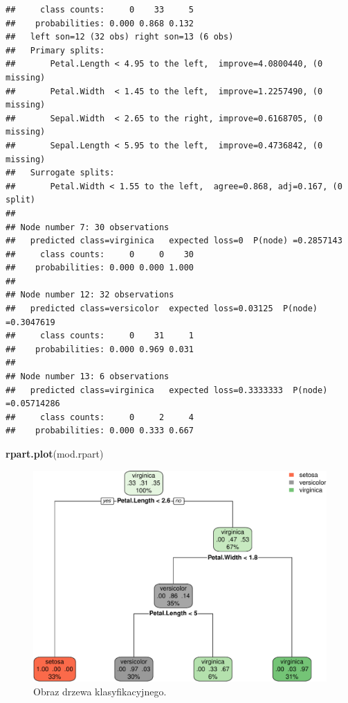 \documentclass[]{book}
\newenvironment{Shaded}{\begin{snugshade}}{\end{snugshade}}
\newcommand{\KeywordTok}[1]{\textcolor[rgb]{0.13,0.29,0.53}{\textbf{#1}}}
\newcommand{\NormalTok}[1]{#1}
\theoremstyle{plain}
\theoremstyle{definition}
\theoremstyle{definition}
\theoremstyle{definition}
\theoremstyle{definition}
\theoremstyle{remark}
\begin{document}
\begin{verbatim}
##     class counts:     0    33     5
##    probabilities: 0.000 0.868 0.132 
##   left son=12 (32 obs) right son=13 (6 obs)
##   Primary splits:
##       Petal.Length < 4.95 to the left,  improve=4.0800440, (0 missing)
##       Petal.Width  < 1.45 to the left,  improve=1.2257490, (0 missing)
##       Sepal.Width  < 2.65 to the right, improve=0.6168705, (0 missing)
##       Sepal.Length < 5.95 to the left,  improve=0.4736842, (0 missing)
##   Surrogate splits:
##       Petal.Width < 1.55 to the left,  agree=0.868, adj=0.167, (0 split)
## 
## Node number 7: 30 observations
##   predicted class=virginica   expected loss=0  P(node) =0.2857143
##     class counts:     0     0    30
##    probabilities: 0.000 0.000 1.000 
## 
## Node number 12: 32 observations
##   predicted class=versicolor  expected loss=0.03125  P(node) =0.3047619
##     class counts:     0    31     1
##    probabilities: 0.000 0.969 0.031 
## 
## Node number 13: 6 observations
##   predicted class=virginica   expected loss=0.3333333  P(node) =0.05714286
##     class counts:     0     2     4
##    probabilities: 0.000 0.333 0.667
\end{verbatim}

\begin{Shaded}
\begin{Highlighting}[]
\KeywordTok{rpart.plot}\NormalTok{(mod.rpart)}
\end{Highlighting}
\end{Shaded}

\begin{figure}
\centering
\includegraphics{EksploracjaDanych_files/figure-latex/unnamed-chunk-15-1.pdf}
\caption{\label{fig:unnamed-chunk-15}Obraz drzewa klasyfikacyjnego.}
\end{figure}
\end{document}
